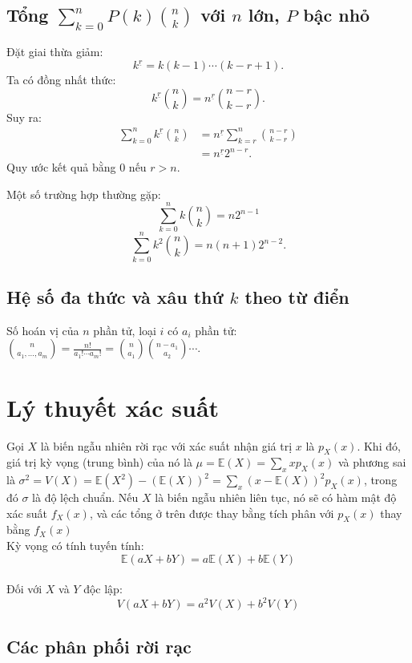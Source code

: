 \subsection{Tổng $\sum_{k=0}^{n} P(k)\binom{n}{k}$ với $n$ lớn, $P$ bậc nhỏ}

Đặt giai thừa giảm:
\[
    k^{\underline r}
    = k(k-1)\cdots(k-r+1).
\]
Ta có đồng nhất thức:
\[
    k^{\underline r}\binom{n}{k}
    = n^{\underline r}\binom{n-r}{k-r}.
\]
Suy ra:
\[
\begin{aligned}
    \sum_{k=0}^{n} k^{\underline r}\binom{n}{k}
    &= n^{\underline r}
       \sum_{k=r}^{n}\binom{n-r}{k-r} \\
    &= n^{\underline r}2^{n-r}.
\end{aligned}
\]
Quy ước kết quả bằng $0$ nếu $r>n$.

Một số trường hợp thường gặp:
\[
    \sum_{k=0}^{n} k\binom{n}{k}
    = n2^{n-1}
\]
\[
    \sum_{k=0}^{n} k^2\binom{n}{k}
    = n(n+1)2^{n-2}.
\]


\subsection{Hệ số đa thức và xâu thứ $k$ theo từ điển}
Số hoán vị của $n$ phần tử, loại $i$ có $a_i$ phần tử:
$\binom{n}{a_1,\dots,a_m} = \frac{n!}{a_1!\cdots a_m!} = \binom{n}{a_1}\binom{n-a_1}{a_2}\cdots$.

\section{Lý thuyết xác suất}
Gọi $X$ là biến ngẫu nhiên rời rạc với xác suất nhận giá trị $x$ là $p_X(x)$. Khi đó, giá trị kỳ vọng (trung bình) của nó là $\mu=\mathbb{E}(X)=\sum_x x p_X(x)$ và phương sai là $\sigma^2=V(X)=\mathbb{E}(X^2)-(\mathbb{E}(X))^2=\sum_x(x-\mathbb{E}(X))^2 p_X(x)$, trong đó $\sigma$ là độ lệch chuẩn. Nếu $X$ là biến ngẫu nhiên liên tục, nó sẽ có hàm mật độ xác suất $f_X(x)$, và các tổng ở trên được thay bằng tích phân với $p_X(x)$ thay bằng $f_X(x)$ \\
Kỳ vọng có tính tuyến tính: \\
$$\mathbb{E}(aX+bY) = a\mathbb{E}(X)+b\mathbb{E}(Y)$$ \\
Đối với $X$ và $Y$ độc lập: \\
$$V(aX+bY) = a^2V(X)+b^2V(Y)$$

\subsection{Các phân phối rời rạc}

